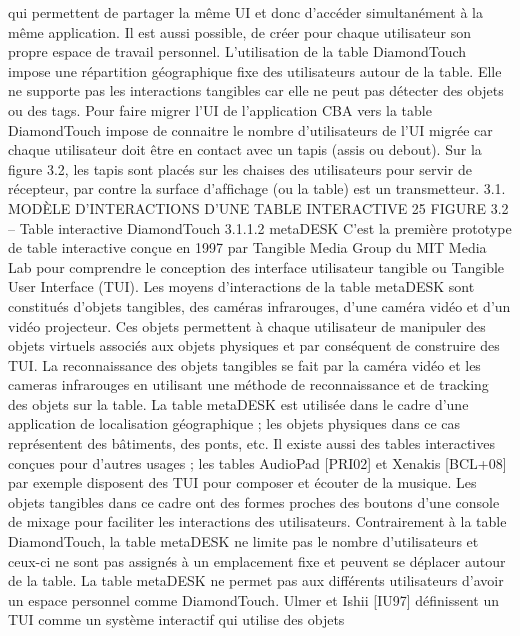 \documentclass{article}
\begin{document}
qui permettent de partager la m\^{e}me UI et donc d’acc\'{e}der simultan\'{e}ment \`{a} la m\^{e}me application. Il est
aussi possible, de cr\'{e}er pour chaque utilisateur son propre espace de travail personnel. L’utilisation de
la table DiamondTouch impose une r\'{e}partition g\'{e}ographique ﬁxe des utilisateurs autour de la table.
Elle ne supporte pas les interactions tangibles car elle ne peut pas d\'{e}tecter des objets ou des tags.
Pour faire migrer l’UI de l’application CBA vers la table DiamondTouch impose de connaitre le
nombre d’utilisateurs de l’UI migr\'{e}e car chaque utilisateur doit \^{e}tre en contact avec un tapis (assis ou
debout). Sur la ﬁgure 3.2, les tapis sont plac\'{e}s sur les chaises des utilisateurs pour servir de r\'{e}cepteur,
par contre la surface d’afﬁchage (ou la table) est un transmetteur.
3.1. MODÈLE D’INTERACTIONS D’UNE TABLE INTERACTIVE
25
FIGURE 3.2 – Table interactive DiamondTouch
3.1.1.2
metaDESK
C’est la premi\`{e}re prototype de table interactive con\c{c}ue en 1997 par Tangible Media Group du MIT
Media Lab pour comprendre le conception des interface utilisateur tangible ou Tangible User Interface (TUI). Les moyens d’interactions de la table metaDESK sont constitu\'{e}s d’objets tangibles, des
cam\'{e}ras infrarouges, d’une cam\'{e}ra vid\'{e}o et d’un vid\'{e}o projecteur. Ces objets permettent \`{a} chaque utilisateur de manipuler des objets virtuels associ\'{e}s aux objets physiques et par cons\'{e}quent de construire
des TUI. La reconnaissance des objets tangibles se fait par la cam\'{e}ra vid\'{e}o et les cameras infrarouges
en utilisant une m\'{e}thode de reconnaissance et de tracking des objets sur la table. La table metaDESK
est utilis\'{e}e dans le cadre d’une application de localisation g\'{e}ographique ; les objets physiques dans
ce cas repr\'{e}sentent des b\^{a}timents, des ponts, etc. Il existe aussi des tables interactives con\c{c}ues pour
d’autres usages ; les tables AudioPad [PRI02] et Xenakis [BCL+08] par exemple disposent des TUI
pour composer et \'{e}couter de la musique. Les objets tangibles dans ce cadre ont des formes proches
des boutons d’une console de mixage pour faciliter les interactions des utilisateurs.
Contrairement \`{a} la table DiamondTouch, la table metaDESK ne limite pas le nombre d’utilisateurs
et ceux-ci ne sont pas assign\'{e}s \`{a} un emplacement ﬁxe et peuvent se d\'{e}placer autour de la table.
La table metaDESK ne permet pas aux diff\'{e}rents utilisateurs d’avoir un espace personnel comme
DiamondTouch.
Ulmer et Ishii
[IU97] d\'{e}ﬁnissent un TUI comme un syst\`{e}me interactif qui utilise des objets
\end{document}
